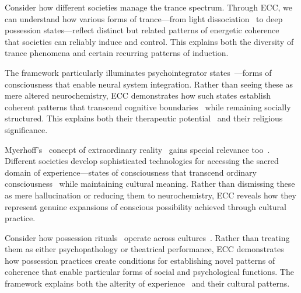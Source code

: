 Consider how different societies manage the trance spectrum. Through ECC, we can understand how various forms of trance—from light dissociation~ to deep possession states—reflect distinct but related patterns of energetic coherence~ that societies can reliably induce and control. This explains both the diversity of trance phenomena and certain recurring patterns of induction.

The framework particularly illuminates psychointegrator states~\cite{winkelman2010shamanism,laughlin1992brain}—forms of consciousness that enable neural system integration. Rather than seeing these as mere altered neurochemistry, ECC demonstrates how such states establish coherent patterns that transcend cognitive boundaries~ while remaining socially structured. This explains both their therapeutic potential~ and their religious significance.

Myerhoff's~\cite{myerhoff1974peyote} concept of extraordinary reality~ gains special relevance too~\cite{armstrong1981powers}. Different societies develop sophisticated technologies for accessing the sacred domain of experience—states of consciousness that transcend ordinary consciousness~ while maintaining cultural meaning. Rather than dismissing these as mere hallucination or reducing them to neurochemistry, ECC reveals how they represent genuine expansions of conscious possibility achieved through cultural practice.

Consider how possession rituals~ operate across cultures~\cite{boddy1994spirit,desjarlais1992body}. Rather than treating them as either psychopathology or theatrical performance, ECC demonstrates how possession practices create conditions for establishing novel patterns of coherence that enable particular forms of social and psychological functions. The framework explains both the alterity of experience~ and their cultural patterns.

